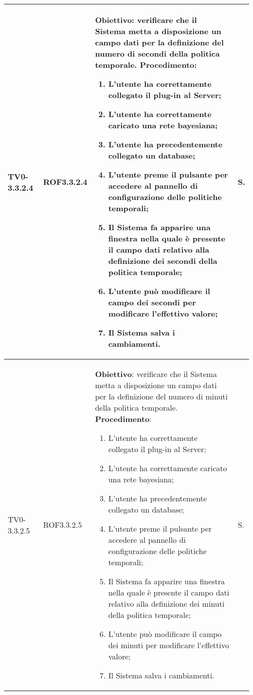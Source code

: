 \begin{longtable}{|C{.15\textwidth}|C{.13\textwidth}|m{.65\textwidth}|C{.08\textwidth}|}
TV0-3.3.2.4 & ROF3.3.2.4 &
	\textbf{Obiettivo}: verificare che il Sistema metta a disposizione un campo dati per la definizione del numero di secondi della politica temporale. \newline
	\textbf{Procedimento}:
	\begin{enumerate}
		\item L'utente ha correttamente collegato il plug-in al Server;
		\item L'utente ha correttamente caricato una rete bayesiana;
		\item L'utente ha precedentemente collegato un database;
		\item L'utente preme il pulsante per accedere al pannello di configurazione delle politiche temporali;
		\item Il Sistema fa apparire una finestra nella quale è presente il campo dati relativo alla definizione dei secondi della politica temporale;
		\item L'utente può modificare il campo dei secondi per modificare l'effettivo valore;
		\item Il Sistema salva i cambiamenti.
	\end{enumerate}
	& S. \\
\hline

TV0-3.3.2.5 & ROF3.3.2.5 &
	\textbf{Obiettivo}: verificare che il Sistema metta a disposizione un campo dati per la definizione del numero di minuti della politica temporale. \newline
	\textbf{Procedimento}:
	\begin{enumerate}
		\item L'utente ha correttamente collegato il plug-in al Server;
		\item L'utente ha correttamente caricato una rete bayesiana;
		\item L'utente ha precedentemente collegato un database;
		\item L'utente preme il pulsante per accedere al pannello di configurazione delle politiche temporali;
		\item Il Sistema fa apparire una finestra nella quale è presente il campo dati relativo alla definizione dei minuti della politica temporale;
		\item L'utente può modificare il campo dei minuti per modificare l'effettivo valore;
		\item Il Sistema salva i cambiamenti.
	\end{enumerate}
	& S. \\
\hline


\end{longtable}
